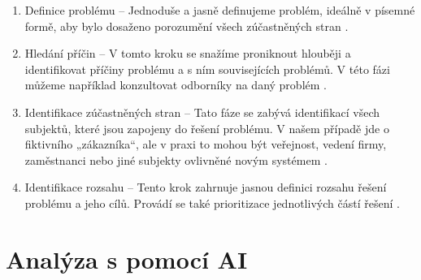 \documentclass[FM,DP]{tulthesis}
\begin{document}
		\begin{enumerate}
			\item Definice problému – Jednoduše a jasně definujeme problém, ideálně v písemné formě, aby bylo dosaženo porozumění všech zúčastněných stran \cite{problem_analysis3}.
			\item Hledání příčin – V tomto kroku se snažíme proniknout hlouběji a identifikovat příčiny problému a s ním souvisejících problémů. V této fázi můžeme například konzultovat odborníky na daný problém \cite{problem_analysis3}.
			\item Identifikace zúčastněných stran – Tato fáze se zabývá identifikací všech subjektů, které jsou zapojeny do řešení problému. V našem případě jde o fiktivního „zákazníka“, ale v praxi to mohou být veřejnost, vedení firmy, zaměstnanci nebo jiné subjekty ovlivněné novým systémem \cite{problem_analysis3}.
			\item Identifikace rozsahu – Tento krok zahrnuje jasnou definici rozsahu řešení problému a jeho cílů. Provádí se také prioritizace jednotlivých částí řešení \cite{problem_analysis3}. 
		\end{enumerate}
		
		\section{Analýza s pomocí AI} 
\end{document}
